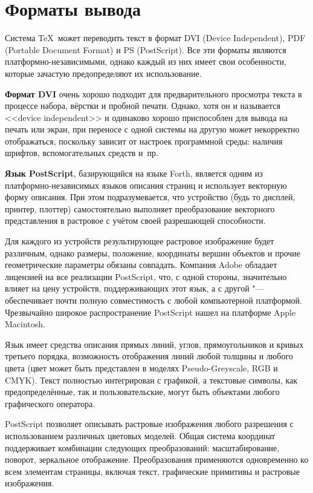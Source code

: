 
	\section{Форматы вывода}\label{Sec:OutFormats}

Система \TeX\ может переводить текст в формат DVI (Device Independent), PDF (Portable Document Format) и PS (PostScript). Все эти форматы являются плат\-фор\-мно-независимыми, однако каждый из них имеет свои особенности, которые зачастую предопределяют их использование.

\textbf{Формат DVI} очень хорошо подходит для предварительного просмотра текста в процессе набора, вёрстки и пробной печати. Однако, хотя он и называется <<device independent>> и одинаково хорошо приспособлен для вывода на печать или экран, при переносе с одной системы на другую может некорректно отображаться, поскольку зависит от настроек программной среды: наличия шрифтов, вспомогательных средств и~пр.

\textbf{Язык PostScript}, базирующийся на языке Forth, является одним из плат\-фор\-мно-не\-за\-ви\-си\-мых языков описания страниц и использует векторную форму описания. При этом подразумевается, что устройство (будь то дисплей, принтер, плоттер) самостоятельно выполняет преобразование векторного представления в растровое с учётом своей разрешающей способности.

Для каждого из устройств результирующее растровое изображение будет различным, однако размеры, положение, координаты вершин объектов и прочие геометрические параметры обязаны совпадать. Компания Adobe обладает лицензией на все реализации  PostScript, что, с одной стороны, значительно влияет на цену устройств, поддерживающих этот язык, а с другой "--- обеспечивает почти полную совместимость с любой компьютерной платформой. Чрезвычайно широкое распространение PostScript нашел на платформе Apple Macintosh.

Язык имеет средства описания прямых линий, углов, прямоугольников и кривых третьего порядка, возможность отображения линий любой толщины и любого цвета (цвет может быть представлен в моделях Pseudo-Greyscale, RGB и CMYK). Текст полностью интегрирован с графикой, а текстовые символы, как предопределённые, так и пользовательские, могут быть объектами любого графического оператора.

PostScript позволяет описывать растровые изображения любого разрешения с использованием различных цветовых моделей. Общая система координат поддерживает комбинации следующих преобразований: масштабирование, поворот, зеркальное отображение. Преобразования применяются одновременно ко всем элементам страницы, включая текст, графические примитивы и растровые изображения.

